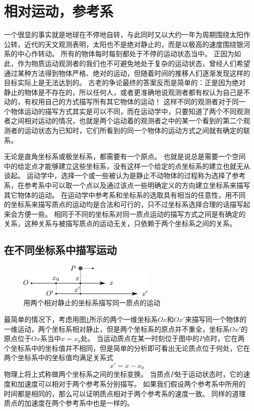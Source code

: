\section{相对运动，参考系}
一个很显的事实就是地球在不停地自转，与此同时又以大约一年为周期围绕太阳作公转，近代的天文观测表明，太阳也不是绝对静止的，而是以极高的速度围绕银河系的中心作转动。
所有的物体每时每刻都处于不停的运动状态当中。
正因为如此，作为物质运动观测者的我们也不可避免地处于复杂的运动状态，曾经人们希望通过某种方法得到物体严格、绝对的运动，但随着时间的推移人们逐渐发现这样的目标实际上是无法达到的。
古老的争论最终的答案反而是简单的：正是因为绝对静止的物体是不存在的，所以任何人，或者更准确地说观测者都有权认为自己是不动的，有权用自己的方式描写所有其它物体的运动！
这样不同的观测者对于同一个物体运动的描写方式其实是可以不同，而在运动学中，只要知道了两个不同观测者之间相对运动的情况，也就是两个运动着的观测者之中的某一个看到的第二个观测者的运动状态为已知时，它们所看到的同一个物体的运动方式之间就有确定的联系。



无论是直角坐标系或极坐标系，都需要有一个原点。
也就是说总是需要一个空间中的给定点才能够建立这些坐标系，没有这样一个给定的点坐标系的建立也就无从谈起。
运动学中，选择一个或一些被认为是静止不动物体的过程称为选择了{\heiti 参考系}，在参考系中可以取一个点以及通过该点一些明确定义的方向建立{\heiti 坐标系}来描写其它物体的运动。
在运动学中参考系和坐标系的选取具有相当的任意性，用不同的坐标系来描写质点的运动均是合法和可行的，只不过坐标系选择合理的话描写起来会方便一些。
相同于不同的坐标系对同一质点运动的描写方式之间是有确定的关系，这种关系与被描写质点的运动无关，只依赖于两个坐标系之间的关系。


\subsection{在不同坐标系中描写运动}
\begin{figure}[hbtp]
\centering
\includegraphics[width=0.6\textwidth]{images/motion-28.pdf}
\caption{用两个相对静止的坐标系描写同一质点的运动}\label{fig: motion-用两个相对静止的坐标系描写同一质点的运动}
\end{figure}

最简单的情况下，考虑用图\ref{fig: motion-用两个相对静止的坐标系描写同一质点的运动}所示的两个一维坐标系$Ox$和$Ox'$来描写同一个物体的一维运动，两个坐标系相对静止，但是两个坐标系的原点并不重全，坐标系$Ox'$的原点位于$Ox$系当中$x=x_0$处。
当运动质点在某一时刻位于图中的$P$点时，它在两个坐标系中的坐标值并不相同，但是简单的分析即可看出无论质点位于何处，它在两个坐标系中的坐标值均满足关系式
\begin{equation}
x' = x - x_0
\end{equation}
物理上将上式称做两个坐标系之间的{\heiti 坐标变换}。
当质点$P$处于运动状态时，它的速度和加速度可以相对于两个参考系分别描写。
如果我们假设两个参考系中所用的时间都是相同的，那么可以证明质点相对于两个参考系的速度一致。
同样的道理质点的加速度在两个参考系中也是一样的。

